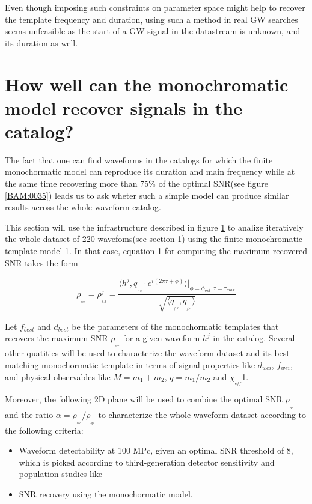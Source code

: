 Even though imposing such constraints on parameter space might help to recover the template frequency and duration, using such a method in real GW searches seems unfeasible as the start of a GW signal in the datastream is unknown, and its duration as well.

\newpage
\section{How well can the monochromatic model recover signals in the catalog?}

The fact that one can find waveforms in the catalogs for which the finite monochormatic model can reproduce its duration and main frequency while at the same time recovering more than 75\%  of the optimal SNR(see figure \ref{BAM:0035}) leads us to ask wheter such a simple model can produce similar results across the whole waveform catalog. 
 
This section will use the infrastructure described in figure \ref{} to analize iteratively the whole dataset of 220 wavefoms(see section \ref{}) using the finite monochromatic template model \ref{}. In that case, equation \ref{} for computing the maximum recovered SNR takes the form 


\begin{equation}\label{eq:21}
\rho_{_{_{rec}}} = \rho^j_{_{_{f,d}}} = \frac{\langle h^j, q_{_{_{f,d}}}\cdot e^{i(2\pi \tau+\phi)}\rangle \bigg\rvert_{\phi =\phi_{opt},\tau =\tau_{max}}}{\sqrt{\langle  q_{_{_{f,d}}},q_{_{_{f,d}}} \rangle}}
\end{equation}



Let $f_{best}$ and $d_{best}$ be the parameters of the monochormatic templates that recovers the maximum SNR $\rho_{_{_{rec}}}$ for a given waveform $h^j$ in the catalog. Several other quatities will be used to characterize the waveform dataset and its best matching monochormatic template in terms of signal properties like $d_{wei}$, $f_{wei}$, and physical observables like $M=m_1+m_2$, $q=m_1/m_2$ and $\chi_{_{eff}}$\ref{}.


Moreover, the following 2D plane will be used to combine the optimal SNR $\rho_{_{_{opt}}}$ and the ratio $\alpha=\rho_{_{_{rec}}}/\rho_{_{_{opt}}}$ to characterize the whole waveform dataset according to the following criteria:

\begin{itemize}

\item Waveform detectability at 100 MPc, given an optimal SNR threshold of 8, which is picked according to third-generation detector sensitivity and population studies like \cite[section 3]{https://doi.org/10.48550/arxiv.2109.09882}

\item SNR recovery using the monochormatic model.


\end{itemize}

